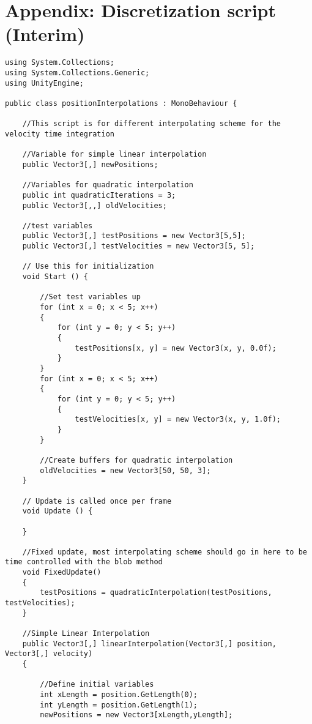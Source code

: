 \section{Appendix: Discretization script (Interim)}

\begin{mdframed}[linecolor=black, topline=true, bottomline=true,
  leftline=false, rightline=false]
\begin{verbatim}
using System.Collections;
using System.Collections.Generic;
using UnityEngine;

public class positionInterpolations : MonoBehaviour {

    //This script is for different interpolating scheme for the velocity time integration

    //Variable for simple linear interpolation
    public Vector3[,] newPositions;

    //Variables for quadratic interpolation
    public int quadraticIterations = 3;
    public Vector3[,,] oldVelocities;

    //test variables
    public Vector3[,] testPositions = new Vector3[5,5];
    public Vector3[,] testVelocities = new Vector3[5, 5];

    // Use this for initialization
    void Start () {
		
        //Set test variables up
        for (int x = 0; x < 5; x++)
        {
            for (int y = 0; y < 5; y++)
            {
                testPositions[x, y] = new Vector3(x, y, 0.0f);
            }
        }
        for (int x = 0; x < 5; x++)
        {
            for (int y = 0; y < 5; y++)
            {
                testVelocities[x, y] = new Vector3(x, y, 1.0f);
            }
        }

        //Create buffers for quadratic interpolation
        oldVelocities = new Vector3[50, 50, 3];
    }
	
	// Update is called once per frame
	void Update () {
		
	}

    //Fixed update, most interpolating scheme should go in here to be time controlled with the blob method
    void FixedUpdate()
    {
        testPositions = quadraticInterpolation(testPositions, testVelocities);
    }

    //Simple Linear Interpolation
    public Vector3[,] linearInterpolation(Vector3[,] position, Vector3[,] velocity)
    {

        //Define initial variables
        int xLength = position.GetLength(0);
        int yLength = position.GetLength(1);
        newPositions = new Vector3[xLength,yLength];


\end{verbatim}
\end{mdframed}
